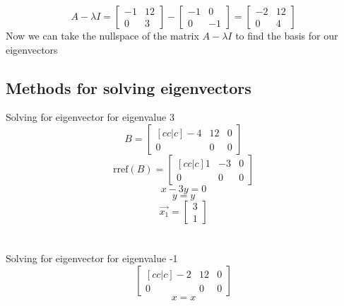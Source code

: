 \documentclass[12pt]{article}
\begin{document}
\begin{equation*}A-\lambda I = \begin{bmatrix}-1 & 12 \\ 0 & 3\end{bmatrix}- \begin{bmatrix}-1 & 0 \\ 0 & -1\end{bmatrix} = \begin{bmatrix}-2 & 12 \\ 0 & 4\end{bmatrix} \end{equation*}
Now we can take the nullspace of the matrix $A-\lambda I$ to find the basis for our eigenvectors
\subsection{Methods for solving eigenvectors}
 Solving for eigenvector for eigenvalue 3
\begin{equation*}
B = \begin{bmatrix}[cc|c]-4 & 12 & 0 \\ 0 & 0 & 0\end{bmatrix}
\end{equation*}
\begin{equation*}
\text{rref}(B) = \begin{bmatrix}[cc|c]1 & -3 & 0 \\ 0 & 0 & 0\end{bmatrix}
\end{equation*}
\begin{equation*}
x-3y = 0
\end{equation*}
\begin{equation*}
y = y
\end{equation*}
\begin{equation*}
\vec{x_1} = \begin{bmatrix}3 \\ 1\end{bmatrix}
\end{equation*}
\\\\ Solving for eigenvector for eigenvalue -1
\begin{equation*}
\begin{bmatrix}[cc|c]-2 & 12  &0 \\ 0 & 0 & 0\end{bmatrix}
\end{equation*}
\begin{equation*}
x = x
\end{equation*}
\end{document}
